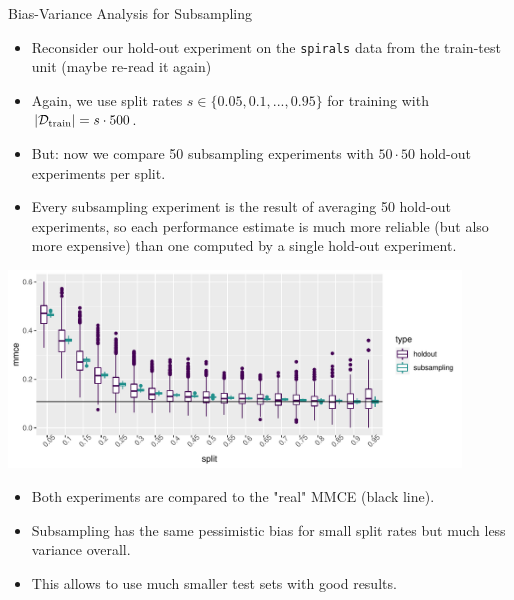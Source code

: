 \begin{vbframe}{Bias-Variance Analysis for Subsampling}

  \begin{itemize}
    \item Reconsider our hold-out experiment on the \texttt{spirals} data from 
    the train-test unit (maybe re-read it again)
    \item Again, we use split rates $s \in \{0.05, 0.1, ..., 0.95\}$ for 
    training with $|\mathcal{D}_{\text{train}}| = s \cdot 500$.
    \item But: now we compare 50 subsampling experiments with $50 \cdot 50$ 
    hold-out experiments per split.
    \item Every subsampling experiment is the result of averaging 50 hold-out 
    experiments, so each performance estimate is much more reliable (but also 
    more expensive) than one computed by a single hold-out experiment.
  \end{itemize}

\framebreak

\begin{center}
\includegraphics[width=0.9\textwidth]{figure/eval-resampling-example-1}
\end{center}



\begin{itemize}
  \item Both experiments are compared to the "real" MMCE (black line).
  \item Subsampling has the same pessimistic bias for small split rates but 
  much less variance overall.
  \item This allows to use much smaller test sets with good results.
\end{itemize}

\framebreak


\end{vbframe}
